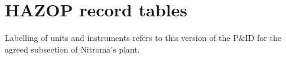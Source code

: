 \section{HAZOP record tables}

Labelling of units and instruments refers to this version of the P\&ID for the agreed subsection of Nitroma's plant.







